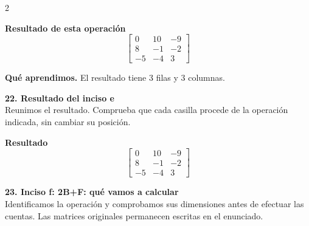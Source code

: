 \documentclass[11pt,a4paper,landscape]{article}
\begin{document}
\begin{multicols*}{2}
\begin{minipage}{\linewidth}
\par{}\par\smallskip
\par\smallskip \textbf{Resultado de esta operación}\[\begin{bmatrix}0 & 10 & -9\\8 & -1 & -2\\-5 & -4 & 3\end{bmatrix}\]
\par\smallskip\textbf{Qué aprendimos.} El resultado tiene 3 filas y 3 columnas.
\end{minipage}\par\medskip
\noindent\begin{minipage}{\linewidth}\textbf{22. Resultado del inciso e}\\[2pt]Reunimos el resultado. Comprueba que cada casilla procede de la operación indicada, sin cambiar su posición.
\par\smallskip \textbf{Resultado}\[\begin{bmatrix}0 & 10 & -9\\8 & -1 & -2\\-5 & -4 & 3\end{bmatrix}\]
\end{minipage}\par\medskip
\noindent\begin{minipage}{\linewidth}\textbf{23. Inciso f: 2B+F: qué vamos a calcular}\\[2pt]Identificamos la operación y comprobamos sus dimensiones antes de efectuar las cuentas. Las matrices originales permanecen escritas en el enunciado.

\end{minipage}
\end{multicols*}
\end{document}
